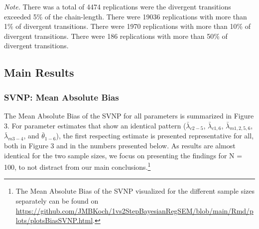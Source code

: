 \documentclass[
  man, donotrepeattitle,floatsintext]{apa6}
\begin{document}
\begin{table}[tbp]
\begin{center}
\begin{threeparttable}
\begin{tablenotes}[para]
\normalsize{\textit{Note.} There was a total of 4474 replications were the divergent transitions exceeded 5\% of the chain-length. There were 19036 replications with more than 1\% of divergent transitions. There were 1970 replications with more than 10\% of divergent transitions. There were 186 replications with more than 50\% of divergent transitions.}
\end{tablenotes}

\end{threeparttable}
\end{center}

\end{table}

\hypertarget{main-results}{%
\subsection{Main Results}\label{main-results}}

\hypertarget{svnp-mean-absolute-bias}{%
\subsubsection{SVNP: Mean Absolute Bias}\label{svnp-mean-absolute-bias}}

The Mean Absolute Bias of the SVNP for all parameters is summarized in Figure 3. For parameter estimates that show an identical pattern (\(\bar{\lambda}_{c 2-5}\), \(\bar{\lambda}_{c 1, 6}\), \(\bar{\lambda}_{m 1, 2, 5, 6}\), \(\bar{\lambda}_{m 3-4}\), and \(\bar{\theta}_{1-6}\)), the first respecting estimate is presented representative for all, both in Figure 3 and in the numbers presented below. As results are almost identical for the two sample sizes, we focus on presenting the findings for N = 100, to not distract from our main conclusions.\footnote{The Mean Absolute Bias of the SVNP visualized for the different sample sizes separately can be found on \url{https://github.com/JMBKoch/1vs2StepBayesianRegSEM/blob/main/Rmd/plots/plotsBiasSVNP.html}.}
\end{document}
